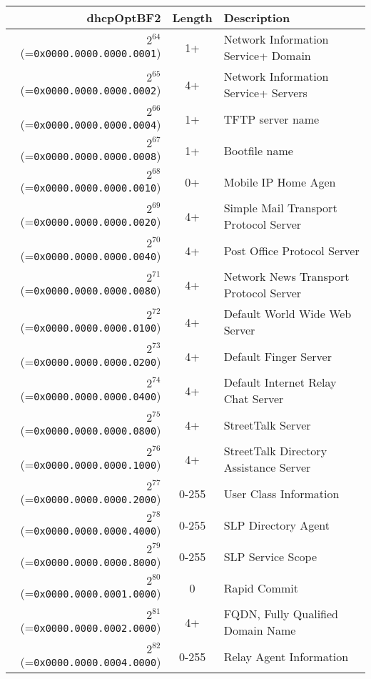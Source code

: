 \documentclass[documentation]{subfiles}
\begin{document}
\begin{small}
    \begin{longtable}{rcl}
        \toprule
        {\bf dhcpOptBF2} & {\bf Length} & {\bf Description}\\
        \midrule\endhead%
        $2^{64}$  (={\tt 0x0000.0000.0000.0001}) & 1+    & Network Information Service+ Domain \\
        $2^{65}$  (={\tt 0x0000.0000.0000.0002}) & 4+    & Network Information Service+ Servers \\
        $2^{66}$  (={\tt 0x0000.0000.0000.0004}) & 1+    & TFTP server name \\
        $2^{67}$  (={\tt 0x0000.0000.0000.0008}) & 1+    & Bootfile name \\
        $2^{68}$  (={\tt 0x0000.0000.0000.0010}) & 0+    & Mobile IP Home Agen \\
        $2^{69}$  (={\tt 0x0000.0000.0000.0020}) & 4+    & Simple Mail Transport Protocol Server \\
        $2^{70}$  (={\tt 0x0000.0000.0000.0040}) & 4+    & Post Office Protocol Server \\
        $2^{71}$  (={\tt 0x0000.0000.0000.0080}) & 4+    & Network News Transport Protocol Server \\
        $2^{72}$  (={\tt 0x0000.0000.0000.0100}) & 4+    & Default World Wide Web Server \\
        $2^{73}$  (={\tt 0x0000.0000.0000.0200}) & 4+    & Default Finger Server \\
        $2^{74}$  (={\tt 0x0000.0000.0000.0400}) & 4+    & Default Internet Relay Chat Server \\
        $2^{75}$  (={\tt 0x0000.0000.0000.0800}) & 4+    & StreetTalk Server \\
        $2^{76}$  (={\tt 0x0000.0000.0000.1000}) & 4+    & StreetTalk Directory Assistance Server \\
        $2^{77}$  (={\tt 0x0000.0000.0000.2000}) & 0-255 & User Class Information \\
        $2^{78}$  (={\tt 0x0000.0000.0000.4000}) & 0-255 & SLP Directory Agent \\
        $2^{79}$  (={\tt 0x0000.0000.0000.8000}) & 0-255 & SLP Service Scope \\
        $2^{80}$  (={\tt 0x0000.0000.0001.0000}) & 0     & Rapid Commit \\
        $2^{81}$  (={\tt 0x0000.0000.0002.0000}) & 4+    & FQDN, Fully Qualified Domain Name \\
        $2^{82}$  (={\tt 0x0000.0000.0004.0000}) & 0-255 & Relay Agent Information \\

\end{longtable}
\end{small}
\end{document}

